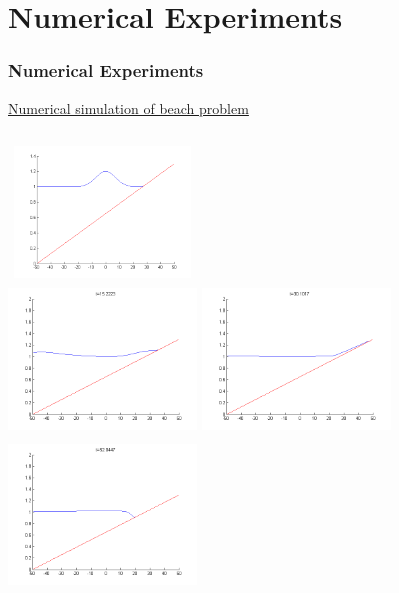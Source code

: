 \documentclass{beamer}
\begin{document}
\section{Numerical Experiments}
\frame
{
\frametitle{Numerical Experiments}
\href{run:./beach.mp4}{Numerical simulation of beach problem}
\begin{columns}[t]
\centering
\includegraphics[width=5cm,height=3.5cm]{beach1.png}\\
\includegraphics[width=5cm,height=4cm]{beach2.png}
\centering
\includegraphics[width=5cm,height=4cm]{beach3.png}\\
\includegraphics[width=5cm,height=4cm]{beach4.png}
\end{columns}
}
\frame
\end{document}
